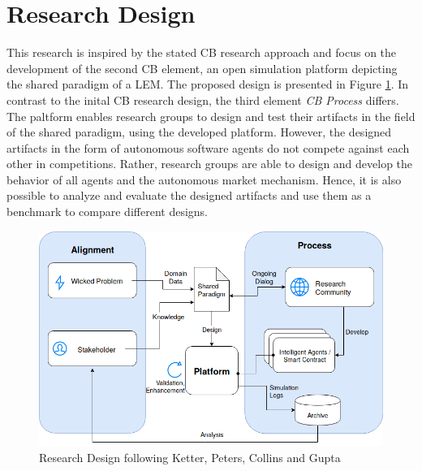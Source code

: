 \section{Research Design}
\label{sec:research_design}

This research is inspired by the stated CB research approach and focus on the development of 
the second CB element, an open simulation platform depicting the shared paradigm of a LEM. 
The proposed design is presented in Figure \ref{figure:competitive_benchmarking}. 
In contrast to the inital CB research design, the third element \textit{CB Process} differs. 
The paltform enables research groups to design and test their artifacts in the field of the shared 
paradigm, using the developed platform. However, the designed artifacts in the form of autonomous 
software agents do not compete against each other in competitions. 
Rather, research groups are able to design and develop the behavior of all agents and the 
autonomous market mechanism. Hence, it is also possible to analyze and evaluate the designed 
artifacts and use them as a benchmark to compare different designs. 

\begin{figure}[htbp]
	\centering
	\includegraphics[width=1\linewidth]{./figures/competitive_benchmarking.png}
	\caption{Research Design following Ketter, Peters, Collins and Gupta}
	\label{figure:competitive_benchmarking}
\end{figure}


